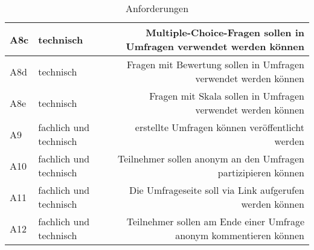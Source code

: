 \begin{table}[!htbp]
\begin{tabularx}{\textwidth}{|l|k|r|}
      \hline
      {\label{Anf:A8c}A8c} & technisch & Multiple-Choice-Fragen sollen in Umfragen verwendet werden können \\
      \hline
      {\label{Anf:A8d}A8d} & technisch & Fragen mit Bewertung sollen in Umfragen verwendet werden können \\
      \hline
      {\label{Anf:A8e}A8e} & technisch & Fragen mit Skala sollen in Umfragen verwendet werden können \\
      \hline
      {\label{Anf:A9}A9} & fachlich und technisch & erstellte Umfragen können veröffentlicht werden \\
      \hline
      {\label{Anf:A10}A10} & fachlich und technisch & Teilnehmer sollen anonym an den Umfragen partizipieren können \\
      \hline
      {\label{Anf:A11}A11} & fachlich und technisch & Die Umfrageseite soll via Link aufgerufen werden können \\
      \hline
      {\label{Anf:A12}A12} & fachlich und technisch & Teilnehmer sollen am Ende einer Umfrage anonym kommentieren können \\
      \hline
    \end{tabularx}
    \caption{Anforderungen}
    \label{tab:Anforderungen}
\end{table}